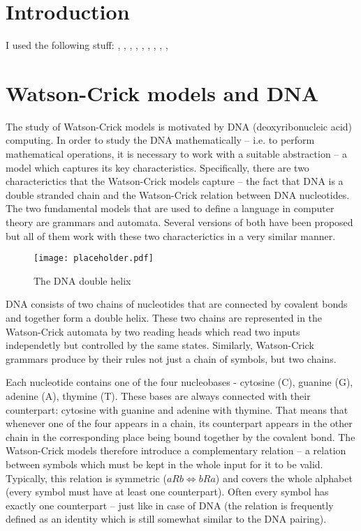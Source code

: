 \chapter{Introduction}

I used the following stuff: \cite{A1}, \cite{DETERM_WKA}, \cite{A3}, \cite{A4}, \cite{A5}, \cite{A6}, \cite{A7}, \cite{WK_CYK}, \cite{WK_PUSHDOWN_AUT}, \cite{WK_FIN_AUT}


\chapter{Watson-Crick models and DNA}
The study of Watson-Crick models is motivated by DNA (deoxyribonucleic acid) computing. In order to study the DNA mathematically -- i.e. to perform mathematical operations, it is necessary to work with a suitable abstraction -- a model which captures its key characteristics. Specifically, there are two characterictics that the Watson-Crick models capture -- the fact that DNA is a double stranded chain and the Watson-Crick relation between DNA nucleotides.
The two fundamental models that are used to define a language in computer theory are grammars and automata. Several versions of both have been proposed but all of them work with these two characterictics in a very similar manner.

\begin{figure}
  \texttt{[image: placeholder.pdf]}
  \centering
  \caption{The DNA double helix}
\end{figure}

DNA consists of two chains of nucleotides that are connected by covalent bonds and together form a double helix. These two chains are represented in the Watson-Crick automata by two reading heads which read two inputs independetly but controlled by the same states. Similarly, Watson-Crick grammars produce by their rules not just a chain of symbols, but two chains.

Each nucleotide contains one of the four nucleobases - cytosine (C), guanine (G), adenine (A), thymine (T). These bases are always connected with their counterpart: cytosine with guanine and adenine with thymine. That means that whenever one of the four appears in a chain, its counterpart appears in the other chain in the corresponding place being bound together by the covalent bond. The Watson-Crick models therefore introduce a complementary relation -- a relation between symbols which must be kept in the whole input for it to be valid. Typically, this relation is symmetric ($a R b \Leftrightarrow b R a$) and covers the whole alphabet (every symbol must have at least one counterpart). Often every symbol has exactly one counterpart -- just like in case of DNA (the relation is frequently defined as an identity which is still somewhat similar to the DNA pairing).

